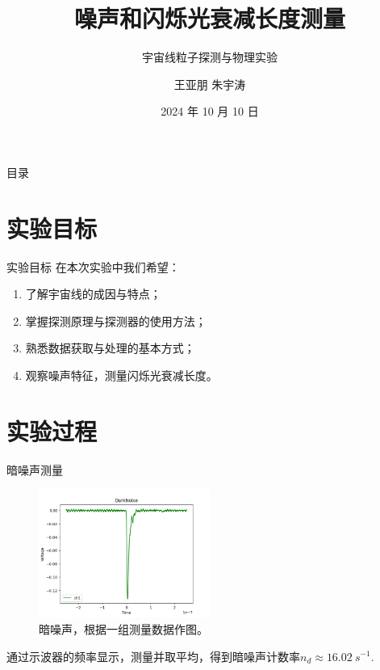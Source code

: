\documentclass[10pt]{beamer}
\author{王亚朋 \quad 朱宇涛}
\date{2024 年 10 月 10 日}
\title{噪声和闪烁光衰减长度测量}
\subtitle{宇宙线粒子探测与物理实验}
\begin{document}
\maketitle
\begin{frame}[label={sec:orgc00309b}]{目录}
\tableofcontents
\end{frame}
\section{实验目标}
\label{sec:orge4e0772}
\begin{frame}[label={sec:org8956bac}]{实验目标}
在本次实验中我们希望\cite{高能宇宙线粒子探测:online}：
\begin{enumerate}
\item 了解宇宙线的成因与特点；
\item 掌握探测原理与探测器的使用方法；
\item 熟悉数据获取与处理的基本方式；
\item 观察噪声特征，测量闪烁光衰减长度。
\end{enumerate}
\end{frame}
\section{实验过程}
\label{sec:org8e580e9}
\begin{frame}[label={sec:org675057c}]{暗噪声测量}
\begin{figure}[htbp]
\centering
\includegraphics[width=0.5\textwidth]{../AttenuationLength/figs/DarkNoise.png}
\caption{暗噪声，根据一组测量数据作图。}
\end{figure}

通过示波器的频率显示，测量并取平均，得到暗噪声计数率\(n_d \approx \qty{16.02}{s^{-1}}\).
\end{frame}
\end{document}

